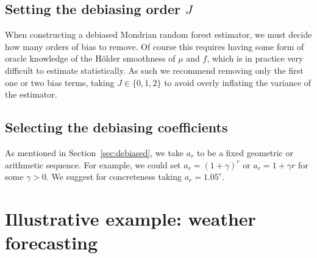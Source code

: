 \subsection{Setting the debiasing order \texorpdfstring{$J$}{J}}%

When constructing a debiased Mondrian random forest estimator,
we must decide how many orders of bias to remove.
Of course this requires having some form of oracle knowledge of the
H{\"o}lder smoothness of $\mu$ and $f$,
which is in practice very difficult to estimate statistically.
As such we recommend removing only the first one or two
bias terms, taking $J \in \{0,1,2\}$
to avoid overly inflating the variance of the estimator.

\subsection{Selecting the debiasing coefficients}%

As mentioned in Section~\ref{sec:debiased},
we take $a_r$ to be a fixed geometric or arithmetic sequence.
For example, we could set
$a_r = (1+\gamma)^r$
or $a_r = 1 + \gamma r$ for some $\gamma > 0$.
We suggest for concreteness taking $a_r = 1.05^r$.

\section{Illustrative example: weather forecasting}%


